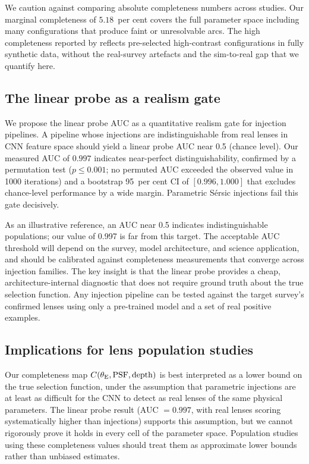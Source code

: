 \documentclass[fleqn,usenatbib]{rasti}
\begin{document}
We caution against comparing absolute completeness numbers across studies.  Our marginal completeness of $5.18$~per cent covers the full parameter space including many configurations that produce faint or unresolvable arcs.  The high completeness reported by \citet{EuclidPrepXXXIII} reflects pre-selected high-contrast configurations in fully synthetic data, without the real-survey artefacts and the sim-to-real gap that we quantify here.

\subsection{The linear probe as a realism gate}

We propose the linear probe AUC as a quantitative realism gate for injection pipelines.  A pipeline whose injections are indistinguishable from real lenses in CNN feature space should yield a linear probe AUC near 0.5 (chance level).  Our measured AUC of $0.997$ indicates near-perfect distinguishability, confirmed by a permutation test ($p \leq 0.001$; no permuted AUC exceeded the observed value in 1000 iterations) and a bootstrap 95~per cent CI of $[0.996, 1.000]$ that excludes chance-level performance by a wide margin.  Parametric S\'{e}rsic injections fail this gate decisively.

As an illustrative reference, an AUC near 0.5 indicates indistinguishable populations; our value of 0.997 is far from this target.  The acceptable AUC threshold will depend on the survey, model architecture, and science application, and should be calibrated against completeness measurements that converge across injection families.  The key insight is that the linear probe provides a cheap, architecture-internal diagnostic that does not require ground truth about the true selection function.  Any injection pipeline can be tested against the target survey's confirmed lenses using only a pre-trained model and a set of real positive examples.

\subsection{Implications for lens population studies}

Our completeness map $C(\theta_{\rm E}, \mathrm{PSF}, \mathrm{depth})$ is best interpreted as a lower bound on the true selection function, under the assumption that parametric injections are at least as difficult for the CNN to detect as real lenses of the same physical parameters.  The linear probe result (AUC $= 0.997$, with real lenses scoring systematically higher than injections) supports this assumption, but we cannot rigorously prove it holds in every cell of the parameter space.  Population studies using these completeness values should treat them as approximate lower bounds rather than unbiased estimates.
\end{document}
